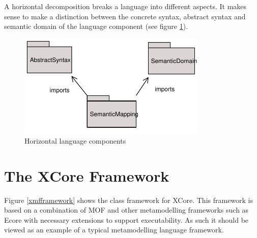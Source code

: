 A horizontal decomposition breaks a language into different
aspects. It makes sense to make a distinction between the concrete
syntax, abstract syntax and semantic domain of the language
component (see figure \ref{horizontal}).

\begin{figure}[htb]
\begin{center}
\includegraphics[width=9cm]{LanguageFamilies/figures/horizontal}
\caption{Horizontal language components} \label{horizontal}
\end{center}
\end{figure}

\section{The XCore Framework}
\label{framework}

Figure \ref{xmfframework} shows the class framework for XCore.
This framework is based on a combination of MOF and other
metamodelling frameworks such as Ecore with necessary extensions
to support executability. As such it should be viewed as an
example of a typical metamodelling language framework.


